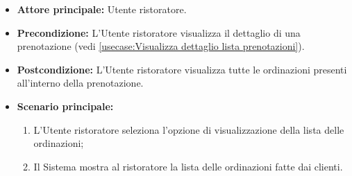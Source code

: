\label{usecase:Visualizzazione lista ordinazioni}
\begin{itemize}
	\item \textbf{Attore principale:} Utente ristoratore.

	\item \textbf{Precondizione:} L'Utente ristoratore visualizza il dettaglio di una prenotazione (vedi \autoref{usecase:Visualizza dettaglio lista prenotazioni}).

	\item \textbf{Postcondizione:} L'Utente ristoratore visualizza tutte le
	      ordinazioni presenti all'interno della prenotazione.

	\item \textbf{Scenario principale:}
	      \begin{enumerate}
		      \item L'Utente ristoratore seleziona l'opzione di visualizzazione della lista delle ordinazioni;

		      \item Il Sistema mostra al ristoratore la lista delle ordinazioni fatte dai clienti.
	      \end{enumerate}
\end{itemize}
